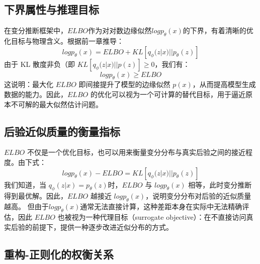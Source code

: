 \documentclass[final]{ws-ijseke}
\begin{document}
\subsection{下界属性与推理目标}
\hspace*{2em} 在变分推断框架中，$ELBO$作为对对数边缘似然$logp_\theta(x)$的下界，有着清晰的优化目标与物理含义。根据前一章推导：
\begin{equation*}
    logp_\theta(x)= ELBO + KL[q_\phi(z|x)||p_\theta(z)]
\end{equation*}
\hspace*{2em} 由于 KL 散度非负（即 $KL[q_\phi(z|x)||p(z)] \ge 0$，我们有：
\begin{equation*}
    logp_\theta(x)\ge ELBO
\end{equation*}
\hspace*{2em} 这说明：最大化 $ELBO$ 即间接提升了模型的边缘似然 $p(x)$，从而提高模型生成数据的能力。因此，$ELBO$ 的优化可以视为一个可计算的替代目标，用于逼近原本不可解的最大似然估计问题。
\subsection{后验近似质量的衡量指标}
\hspace*{2em} $ELBO$ 不仅是一个优化目标，也可以用来衡量变分分布与真实后验之间的接近程度。由下式：
\begin{equation*}
    logp_\theta(x) - ELBO= KL[q_\phi(z|x)||p_\theta(z)]
\end{equation*}
\hspace*{2em} 我们知道，当 $q_\phi(z|x)=p_\theta(z)$时，$ELBO$ 与 $logp_\theta(x)$ 相等，此时变分推断得到最优解。因此，$ELBO$ 越接近 $logp_\theta(x)$，说明变分分布对后验的近似质量越高。
但由于$logp_\theta(x)$通常无法直接计算，这种差距本身在实际中无法精确评估，因此 $ELBO$ 也被视为一种代理目标（surrogate objective）：在不直接访问真实后验的前提下，提供一种逐步改进近似分布的方式。
\subsection{重构-正则化的权衡关系}
\end{document}
